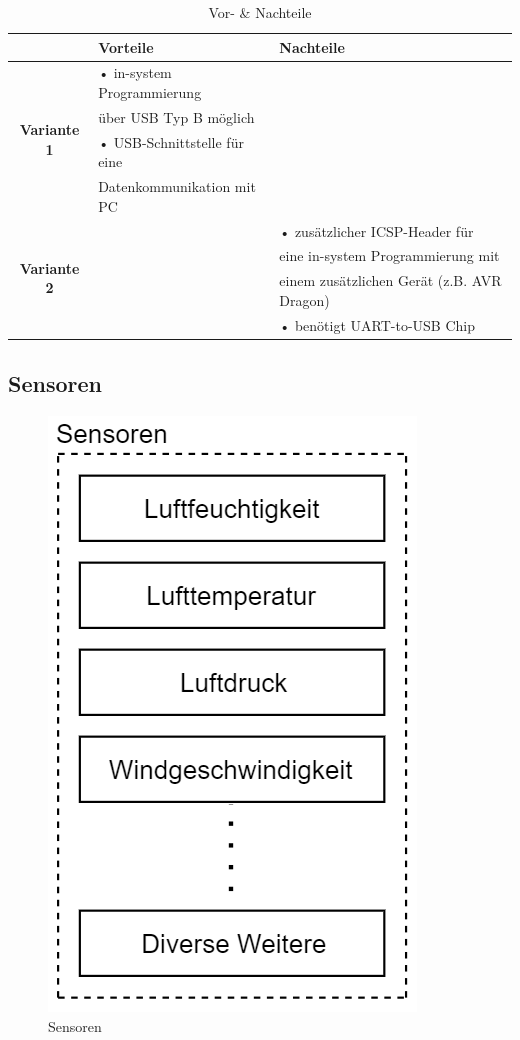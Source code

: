 \begin{table}[h]
  \centering
  \label{tab:mcu}
  \small
  \caption{Vor- \& Nachteile}
    \begin{tabular}{c|l|l}
          & \textbf{Vorteile} & \textbf{Nachteile} \\
    \toprule
    \multirow{4}[2]{*}{\textbf{Variante 1}} & • in-system Programmierung &  \\
          & \hspace{0.3cm} über USB Typ B möglich &  \\
          & • USB-Schnittstelle für eine &  \\
          &   \hspace{0.3cm} Datenkommunikation mit PC &  \\
    \hline
    \multirow{4}[1]{*}{\textbf{Variante 2}} &       & • zusätzlicher ICSP-Header für \\
          &       & \hspace{0.3cm} eine in-system Programmierung mit \\
          &       & \hspace{0.3cm} einem zusätzlichen Gerät (z.B. AVR Dragon) \\
          &       & • benötigt UART-to-USB Chip \\
    \end{tabular}%
  \label{tab:addlabel}%
\end{table}%

\newpage
\subsection{Sensoren}
\begin{figure}[h]
\centering
\includegraphics[scale=0.8]{graphics/Sensoren.PNG}
\caption{Sensoren}
\end{figure}

